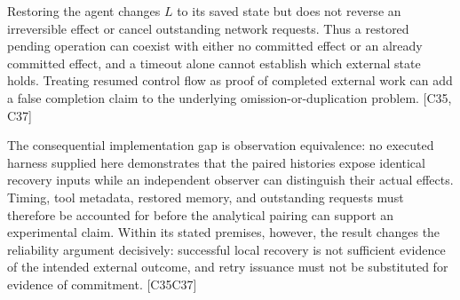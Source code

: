 \documentclass[11pt]{article}
\begin{document}
Restoring the agent changes $L$ to its saved state but does not reverse an irreversible effect or cancel outstanding network requests. Thus a restored pending operation can coexist with either no committed effect or an already committed effect, and a timeout alone cannot establish which external state holds. Treating resumed control flow as proof of completed external work can add a false completion claim to the underlying omission-or-duplication problem. [C35, C37]

The consequential implementation gap is observation equivalence: no executed harness supplied here demonstrates that the paired histories expose identical recovery inputs while an independent observer can distinguish their actual effects. Timing, tool metadata, restored memory, and outstanding requests must therefore be accounted for before the analytical pairing can support an experimental claim. Within its stated premises, however, the result changes the reliability argument decisively: successful local recovery is not sufficient evidence of the intended external outcome, and retry issuance must not be substituted for evidence of commitment. [C35\textendash{}C37]
\end{document}
